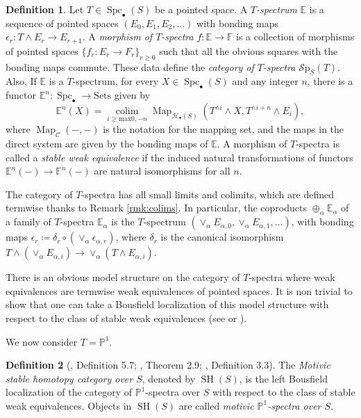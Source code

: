 \documentclass[10pt]{amsart}
\theoremstyle{definition}
\newtheorem{defn}{Definition}[section]
\theoremstyle{plain}
\numberwithin{equation}{section}
\newcommand{\0}{\emptyset}
\newcommand{\sH}{{\mathcal H}}
\newcommand{\E}{{\mathbb E}}
\newcommand{\F}{{\mathbb F}}
\renewcommand{\P}{{\mathbb P}}
\newcommand{\SH}{{\operatorname{SH}}}
\newcommand{\Spc}{{\operatorname{Spc}}}
\newcommand{\Map}{{\operatorname{Map}}}
\newcommand{\colim}{{\operatorname*{colim}}}
\newcommand{\SPP}{{\mathcal{S}\text{p}}}
\begin{document}
\begin{defn}
    Let $T \in \Spc_{\bullet}(S)$ be a pointed space. A \emph{$T$-spectrum} $\E$ is a sequence of pointed spaces $(E_0,E_1, E_2, \ldots)$ with bonding maps $\epsilon_r:T \wedge E_r \to E_{r+1}$. A \emph{morphism of $T$-spectra} $f:\E \to \F$ is a collection of morphisms of pointed spaces $\{f_r:E_r \to F_r\}_{r \ge 0}$ such that all the obvious squares with the bonding maps commute. These data define the \emph{category of $T$-spectra} $\SPP_S(T)$. Also, If $\E$ is a $T$-spectrum, for every $X \in \Spc_{\bullet}(S)$ and any integer $n$, there is a functor $\E^n: \Spc_{\bullet}\to \text{Sets}$ given by
    $$\E^n(X)= \colim_{i \ge \text{max}{0,-n}}\Map_{\sH_{\bullet}(S)}(T^{\wedge i} \wedge X, T^{\wedge i +n}\wedge E_i),$$
    where $\Map_{\mathcal{C}}(-,-)$ is the notation for the mapping set, and the maps in the direct system are given by the bonding maps of $\E$. A morphism of $T$-spectra is called a \emph{stable weak equivalence} if the induced natural transformations of functors $\E^n(-) \to \F^n(-)$ are natural isomorphisms for all $n$.
\end{defn}

The category of $T$-spectra has all small limits and colimits, which are defined termwise thanks to Remark \ref{rmk:colims}. In particular, the coproducts $\oplus_\alpha \E_\alpha$ of a family of $T$-spectra $\E_\alpha$ is the $T$-spectrum $(\vee_\alpha E_{\alpha,0}, \vee_\alpha E_{\alpha, 1}, \ldots)$, with bonding maps $\epsilon_r\coloneqq \delta_r \circ (\vee_\alpha \epsilon_{\alpha,r})$, where $\delta_r$ is the canonical isomorphism $T \wedge (\vee_\alpha E_{\alpha,i}) \to \vee_\alpha (T \wedge E_{\alpha,i})$.

There is an obvious model structure on the category of $T$-spectra where weak equivalences are termwise weak equivalences of pointed spaces. It is non trivial to show that one can take a Bousfield localization of this model structure with respect to the class of stable weak equivalences (see \cite[Appendix A]{Jardine:SymSpectra} or \cite[Section 3]{Hovey:Spectra}). 

We now consider $T=\P^1$.

\begin{defn}[\cite{voe:homotopy_theory}, Definition 5.7; \cite{Jardine:SymSpectra}, Theorem 2.9; \cite{Hovey:Spectra}, Definition 3.3]
    The \emph{Motivic stable homotopy category over $S$}, denoted by $\SH(S)$, is the left Bousfield localization of the category of $\P^1$-spectra over $S$ with respect to the class of stable weak equivalences. Objects in $\SH(S)$ are called \emph{motivic $\P^1$-spectra over $S$}.
\end{defn}
\end{document}
